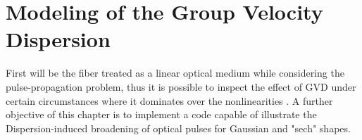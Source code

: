 \chapter{Modeling of the Group Velocity Dispersion}

First will be the fiber treated as a linear optical medium while considering the pulse-propagation problem, thus it is possible to inspect the effect of GVD under certain circumstances where it dominates over the nonlinearities \citep{ AgrawalBook}. A further objective of this chapter is to implement a code capable of illustrate the Dispersion-induced broadening of optical pulses for Gaussian and "sech" shapes.